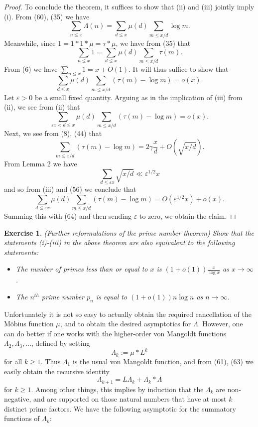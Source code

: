 \documentclass[10pt,reqno]{amsart}
\newtheorem{exercise}[theorem]{Exercise}
\begin{document}
\begin{proof}
    To conclude the theorem, it suffices to show that (ii) and (iii) jointly imply (i). From (60), (35) we have
    \[  \sum_{n \leq x} \Lambda(n) = \sum_{d \leq x} \mu(d) \sum_{m \leq x/d} \log m.\]
    Meanwhile, since $1 = 1 * 1 * \mu = \tau * \mu$, we have from (35) that
    \[  \sum_{n \leq x} 1 = \sum_{d \leq x} \mu(d) \sum_{m \leq x/d} \tau(m).\]
    From (6) we have $\sum_{n \leq x} 1 = x + O(1)$. It will thus suffice to show that
    \[  \sum_{d \leq x} \mu(d) \sum_{m \leq x/d} (\tau(m)-\log m) = o(x).\]
    Let $\varepsilon>0$ be a small fixed quantity. Arguing as in the implication of (iii) from (ii), we see from (ii) that
    \begin{equation}   \sum_{\varepsilon x < d \leq x} \mu(d) \sum_{m \leq x/d} (\tau(m)-\log m) = o(x). \end{equation}
    Next, we see from (8), (44) that
    \[  \sum_{m \leq x/d} (\tau(m)-\log m) = 2 \gamma \frac{x}{d} + O( \sqrt{x/d} ).\]
    From Lemma 2 we have
    \[  \sum_{d \leq \varepsilon x} \sqrt{x/d} \ll \varepsilon^{1/2} x\]
    and so from (iii) and (56) we conclude that
    \[  \sum_{d \leq \varepsilon x} \mu(d) \sum_{m \leq x/d} (\tau(m)-\log m) = O(\varepsilon^{1/2} x ) + o(x).\]
    Summing this with (64) and then sending $\varepsilon$ to zero, we obtain the claim. %
\end{proof}

\begin{exercise} 
    (Further reformulations of the prime number theorem) Show that the statements (i)-(iii) in the above theorem are also equivalent to the following statements:
    \begin{itemize}
        \item[(iv)] The number of primes less than or equal to $x$ is $(1+o(1)) \frac{x}{\log x}$ as $x \rightarrow \infty$.
        \item[(v)] The $n^{th}$ prime number $p_n$ is equal to $(1+o(1)) n\log n$ as $n \rightarrow \infty$.
    \end{itemize}
\end{exercise}

Unfortunately it is not so easy to actually obtain the required cancellation of the Möbius function $\mu$, and to obtain the desired asymptotics for $\Lambda$. However, one can do better if one works with the higher-order von Mangoldt functions $\Lambda_2, \Lambda_3, \dots$, defined by setting
%
\begin{equation}   \Lambda_k := \mu * L^k \end{equation}
%
for all $k \geq 1$. Thus $\Lambda_1$ is the usual von Mangoldt function, and from (61), (63) we easily obtain the recursive identity
%
\begin{equation}   \Lambda_{k+1} = L \Lambda_k + \Lambda_k * \Lambda \end{equation}
%
for $k \geq 1$. Among other things, this implies by induction that the $\Lambda_k$ are non-negative, and are supported on those natural numbers that have at most $k$ distinct prime factors. We have the following asymptotic for the summatory functions of $\Lambda_k$:
\end{document}
